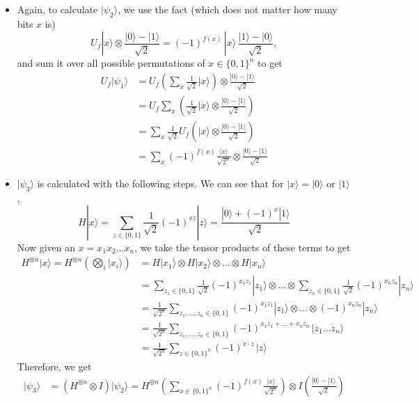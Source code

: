 \documentclass{article}
\theoremstyle{definition}
\begin{document}
\begin{itemize}
  \item Again, to calculate $|\psi_2 \rangle$, we use the fact (which does not matter how many bits $x$ is)
    \[U_f |x\rangle \otimes \frac{|0\rangle - |1\rangle}{\sqrt{2}} = (-1)^{f(x)} \,|x\rangle \, \frac{|1\rangle - |0\rangle}{\sqrt{2}},\]
  and sum it over all possible permutations of $x \in \{0, 1\}^n$ to get 
  \begin{align*} 
    U_f |\psi_1 \rangle & = U_f \left( \sum_x \frac{1}{\sqrt{2}} |x\rangle \right) \otimes \frac{|0\rangle - |1\rangle}{\sqrt{2}} \\
    & = U_f \sum_x \left( \frac{1}{\sqrt{2}} |x\rangle \otimes \frac{|0\rangle - |1\rangle}{\sqrt{2}}\right) \\
    & = \sum_x \frac{1}{\sqrt{2}} U_f \left( |x\rangle \otimes \frac{|0\rangle - |1\rangle}{\sqrt{2}} \right) \\
    & = \sum_x (-1)^{f(x)} \frac{|x\rangle}{\sqrt{2^n}} \otimes \frac{|0\rangle - |1\rangle}{\sqrt{2}}
  \end{align*}
  \item $|\psi_3 \rangle$ is calculated with the following steps. We can see that for $|x\rangle = |0\rangle$ or $|1\rangle$, 
    \[H|x\rangle = \sum_{z \in \{0, 1\}} \frac{1}{\sqrt{2}} (-1)^{xz} |z\rangle = \frac{|0\rangle + (-1)^x |1\rangle}{\sqrt{2}}\]
  Now given an $x = x_1 x_2 \ldots x_n$, we take the tensor products of these terms to get 
  \begin{align*} 
    H^{\otimes n} |x\rangle = H^{\otimes n} \left( \bigotimes_i |x_i \rangle \right) & = H|x_1\rangle \otimes H|x_2\rangle \otimes \ldots \otimes H|x_n\rangle \\
    & = \sum_{z_1 \in \{0, 1\}} \frac{1}{\sqrt{2}} (-1)^{x_1 z_1} |z_1 \rangle \otimes \ldots \otimes \sum_{z_n \in \{0, 1\}} \frac{1}{\sqrt{2}} (-1)^{x_n z_n} |z_n \rangle \\
    & = \frac{1}{\sqrt{2^n}} \sum_{z_1, \ldots, z_n \in \{0, 1\}} (-1)^{x_1 z_1} |z_1 \rangle \otimes \ldots \otimes (-1)^{x_n z_n} |z_n\rangle \\
    & = \frac{1}{\sqrt{2^n}} \sum_{z_1, \ldots, z_n \in \{0, 1\}} (-1)^{x_1 z_1 + \ldots + x_n z_n} \, |z_1 \ldots z_n \rangle \\
    & = \frac{1}{\sqrt{2^n}} \sum_{z \in \{0, 1\}^n} (-1)^{x \cdot z} \, |z\rangle
  \end{align*}
  Therefore, we get 
  \begin{align*} 
    |\psi_3 \rangle & = (H^{\otimes n} \otimes I) |\psi_2 \rangle = H^{\otimes n} \left( \sum_{x \in \{0, 1\}^n} (-1)^{f(x)} \frac{|x\rangle}{\sqrt{2^n}} \right) \otimes I \left( \frac{|0\rangle - |1\rangle}{\sqrt{2}} \right)\\

\end{align*}
\end{itemize}
\end{document}
